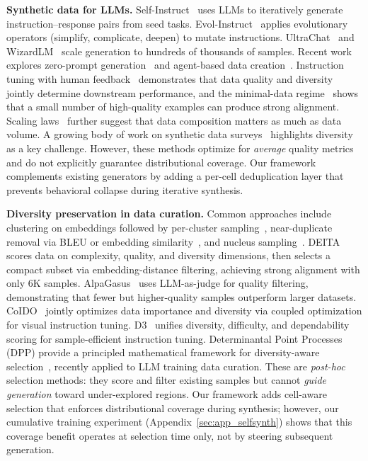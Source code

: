 \documentclass{article}
\begin{document}
\begin{enumerate}[nosep]
\textbf{Synthetic data for LLMs.}
Self-Instruct~\citep{self_instruct_2023} uses LLMs to iteratively generate instruction--response pairs from seed tasks.
Evol-Instruct~\citep{evol_instruct_2023} applies evolutionary operators (simplify, complicate, deepen) to mutate instructions.
UltraChat~\citep{ultrachat_2023} and WizardLM~\citep{wizardlm_2023} scale generation to hundreds of thousands of samples.
Recent work explores zero-prompt generation~\citep{magpie_2024} and agent-based data creation~\citep{glan_2024}.
Instruction tuning with human feedback~\citep{ouyang2022training} demonstrates that data quality and diversity jointly determine downstream performance, and the minimal-data regime~\citep{zhou2023lima} shows that a small number of high-quality examples can produce strong alignment.
Scaling laws~\citep{kaplan2020scaling} further suggest that data composition matters as much as data volume.
A growing body of work on synthetic data surveys~\citep{synth_llm_survey_2024} highlights diversity as a key challenge.
However, these methods optimize for \emph{average} quality metrics and do not explicitly guarantee distributional coverage.
Our framework complements existing generators by adding a per-cell deduplication layer that prevents behavioral collapse during iterative synthesis.

\textbf{Diversity preservation in data curation.}
Common approaches include clustering on embeddings followed by per-cluster sampling~\citep{cluster_sampling_2022}, near-duplicate removal via BLEU or embedding similarity~\citep{dedup_2023}, and nucleus sampling~\citep{temperature_sampling_2023}.
DEITA~\citep{liu2024deita} scores data on complexity, quality, and diversity dimensions, then selects a compact subset via embedding-distance filtering, achieving strong alignment with only 6K samples.
AlpaGasus~\citep{chen2024alpagasus} uses LLM-as-judge for quality filtering, demonstrating that fewer but higher-quality samples outperform larger datasets.
CoIDO~\citep{wang2025coido} jointly optimizes data importance and diversity via coupled optimization for visual instruction tuning.
D3~\citep{d3_2025} unifies diversity, difficulty, and dependability scoring for sample-efficient instruction tuning.
Determinantal Point Processes (DPP) provide a principled mathematical framework for diversity-aware selection~\citep{kulesza2012dpp}, recently applied to LLM training data curation.
These are \emph{post-hoc} selection methods: they score and filter existing samples but cannot \emph{guide generation} toward under-explored regions.
Our framework adds cell-aware selection that enforces distributional coverage during synthesis; however, our cumulative training experiment (Appendix~\ref{sec:app_selfsynth}) shows that this coverage benefit operates at selection time only, not by steering subsequent generation.


\end{enumerate}
\end{document}
